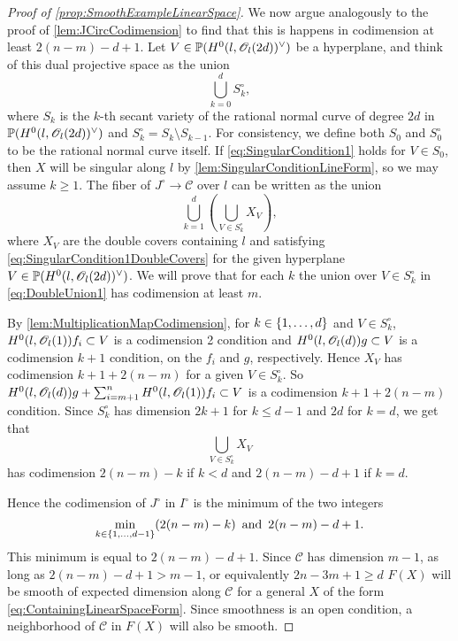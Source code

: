 \begin{proof}[Proof of \cref{prop:SmoothExampleLinearSpace}]
We now argue analogously to the proof of \cref{lem:JCircCodimension} to find that this is happens in codimension at least $2(n-m)-d+1$. Let $V \in \mathbb{P}(H^0(l,\mathscr{O}_l(2d))^\vee)$ be a hyperplane, and think of this dual projective space as the union
\[ \bigcup_{k=0}^d S_k^\circ, \]
where $S_k$ is the $k$-th secant variety of the rational normal curve of degree $2d$ in $\mathbb{P}(H^0(l,\mathscr{O}_l(2d))^\vee)$ and $S_k^\circ = S_k \setminus S_{k-1}$. For consistency, we define both $S_0$ and $S_0^\circ$ to be the rational normal curve itself. If \eqref{eq:SingularCondition1} holds for $V \in S_0$, then $X$ will be singular along $l$ by \cref{lem:SingularConditionLineForm}, so we may assume $k \geq 1$.
The fiber of $J^\circ \to \mathcal{C}$ over $l$ can be written as the union
\begin{equation}
  \label{eq:DoubleUnion1}
   \bigcup_{k=1}^d \left(  \bigcup_{V \in S_{k}^\circ} X_V \right) ,
\end{equation}
where $X_V$ are the double covers containing $l$ and satisfying \eqref{eq:SingularCondition1DoubleCovers} for the given hyperplane $V \in \mathbb{P}(H^0(l,\mathscr{O}_l(2d))^\vee)$. We will prove that for each $k$ the union over $V \in S_k^\circ$ in \eqref{eq:DoubleUnion1} has codimension at least $m$.

By \cref{lem:MultiplicationMapCodimension}, for $k \in \lbrace1,\dots,d\rbrace$ and $V \in S_k^\circ$, $H^0(l,\mathscr{O}_l(1))f_i \subset V$ is a codimension 2 condition and $H^0(l,\mathscr{O}_l(d))g \subset V$ is a codimension $k+1$ condition, on the $f_i$ and $g$, respectively. Hence $X_V$ has codimension $k+1+2(n-m)$ for a given $V \in S_k^\circ$. So $H^0(l,\mathscr{O}_l(d))g + \sum_{i=m+1}^nH^0(l,\mathscr{O}_l(1))f_i \subset V$ is a codimension $k+1+2(n-m)$ condition. Since $S_k^\circ$ has dimension $2k+1$ for $k\leq d-1$ and $2d$ for $k=d$, we get that
\[ \bigcup_{V \in S_{k}^\circ} X_V \]
has codimension $2(n-m)-k$ if $k < d$ and $2(n-m)-d+1$ if $k=d$.

Hence the codimension of $J^\circ$ in $I^\circ$ is the minimum of the two integers
\[\min_{k \in \lbrace1,\dots,d-1\rbrace} (2(n-m)-k) \, \text{ and } \, 2(n-m)-d+1.\]
 This minimum is equal to $2(n-m)-d+1$. Since $\mathcal{C}$ has dimension $m-1$, as long as $2(n-m)-d+1 > m-1$, or equivalently $2n-3m+1 \geq d$ $F(X)$ will be smooth of expected dimension along $\mathcal{C}$ for a general $X$ of the form \eqref{eq:ContainingLinearSpaceForm}. Since smoothness is an open condition, a neighborhood of $\mathcal{C}$ in $F(X)$ will also be smooth.
\end{proof}

